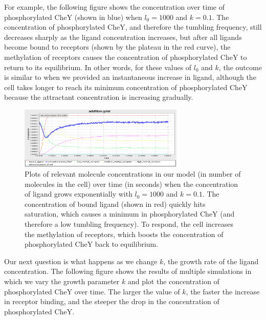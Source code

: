 For example, the following figure shows the concentration over time of phosphorylated CheY (shown in blue) when $l_0 = 1000$ and $k = 0.1$. The concentration of phosphorylated CheY, and therefore the tumbling frequency, still decreases sharply as the ligand concentration increases, but after all ligands become bound to receptors (shown by the plateau in the red curve), the methylation of receptors causes the concentration of phosphorylated CheY to return to its equilibrium. In other words, for these values of $l_0$ and $k$, the outcome is similar to when we provided an instantaneous increase in ligand, although the cell takes longer to reach its minimum concentration of phosphorylated CheY because the attractant concentration is increasing gradually.

\begin{figure}[h]
\centering
\mySfFamily
\includegraphics[width = 0.7\textwidth]{../images/chemotaxis_tutorial_addition01.png}
\caption{Plots of relevant molecule concentrations in our model (in number of molecules in the cell) over time (in seconds) when the concentration of ligand grows exponentially with $l_0 = 1000$ and $k = 0.1$. The concentration of bound ligand (shown in red) quickly hits saturation, which causes a minimum in phosphorylated CheY (and therefore a low tumbling frequency). To respond, the cell increases the methylation of receptors, which boosts the concentration of phosphorylated CheY back to equilibrium.}
\label{fig:chemotaxis_tutorial_addition01}
\end{figure}


Our next question is what happens as we change $k$, the growth rate of the ligand concentration. The following figure shows the results of multiple simulations in which we vary the growth parameter $k$ and plot the concentration of phosphorylated CheY over time. The larger the value of $k$, the faster the increase in receptor binding, and the steeper the drop in the concentration of phosphorylated CheY.

